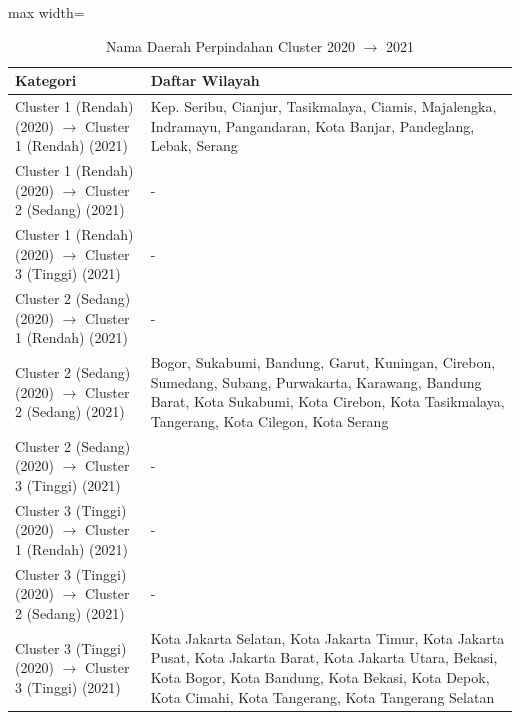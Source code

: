 \begin{table}[H]
\centering
\caption{Nama Daerah Perpindahan Cluster 2020 \(\rightarrow\) 2021} \label{tab:app2transname2020x2021}
\begin{adjustbox}{max width=\textwidth}
\begin{tabular}{|p{4cm}|p{10cm}|}
\hline
\textbf{Kategori} & \textbf{Daftar Wilayah} \\
\hline
Cluster 1 (Rendah) (2020) \(\rightarrow\) Cluster 1 (Rendah) (2021) & Kep. Seribu, Cianjur, Tasikmalaya, Ciamis, Majalengka, Indramayu, Pangandaran, Kota Banjar, Pandeglang, Lebak, Serang \\
\hline
Cluster 1 (Rendah) (2020) \(\rightarrow\) Cluster 2 (Sedang) (2021) & - \\
\hline
Cluster 1 (Rendah) (2020) \(\rightarrow\) Cluster 3 (Tinggi) (2021) & - \\
\hline
Cluster 2 (Sedang) (2020) \(\rightarrow\) Cluster 1 (Rendah) (2021) & - \\
\hline
Cluster 2 (Sedang) (2020) \(\rightarrow\) Cluster 2 (Sedang) (2021) & Bogor, Sukabumi, Bandung, Garut, Kuningan, Cirebon, Sumedang, Subang, Purwakarta, Karawang, Bandung Barat, Kota Sukabumi, Kota Cirebon, Kota Tasikmalaya, Tangerang, Kota Cilegon, Kota Serang \\
\hline
Cluster 2 (Sedang) (2020) \(\rightarrow\) Cluster 3 (Tinggi) (2021) & - \\
\hline
Cluster 3 (Tinggi) (2020) \(\rightarrow\) Cluster 1 (Rendah) (2021) & - \\
\hline
Cluster 3 (Tinggi) (2020) \(\rightarrow\) Cluster 2 (Sedang) (2021) & - \\
\hline
Cluster 3 (Tinggi) (2020) \(\rightarrow\) Cluster 3 (Tinggi) (2021) & Kota Jakarta Selatan, Kota Jakarta Timur, Kota Jakarta Pusat, Kota Jakarta Barat, Kota Jakarta Utara, Bekasi, Kota Bogor, Kota Bandung, Kota Bekasi, Kota Depok, Kota Cimahi, Kota Tangerang, Kota Tangerang Selatan \\
\hline
\end{tabular}
\end{adjustbox}
\end{table}